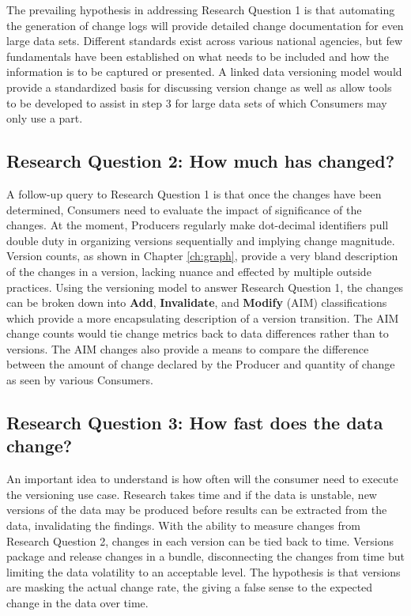 The prevailing hypothesis in addressing Research Question 1 is that automating the generation of change logs will provide detailed change documentation for even large data sets.
Different standards exist across various national agencies, but few fundamentals have been established on what needs to be included and how the information is to be captured or presented.
A linked data versioning model would provide a standardized basis for discussing version change as well as allow tools to be developed to assist in step 3 for large data sets of which Consumers may only use a part.

\subsection{Research Question 2: How much has changed?}

A follow-up query to Research Question 1 is that once the changes have been determined, Consumers need to evaluate the impact of significance of the changes.
At the moment, Producers regularly make dot-decimal identifiers pull double duty in organizing versions sequentially and implying change magnitude.
Version counts, as shown in Chapter \ref{ch:graph}, provide a very bland description of the changes in a version, lacking nuance and effected by multiple outside practices.
Using the versioning model to answer Research Question 1, the changes can be broken down into \textbf{Add}, \textbf{Invalidate}, and \textbf{Modify} (AIM) classifications which provide a more encapsulating description of a version transition.
The AIM change counts would tie change metrics back to data differences rather than to versions.
The AIM changes also provide a means to compare the difference between the amount of change declared by the Producer and quantity of change as seen by various Consumers.

\subsection{Research Question 3: How fast does the data change?}

An important idea to understand is how often will the consumer need to execute the versioning use case.
Research takes time and if the data is unstable, new versions of the data may be produced before results can be extracted from the data, invalidating the findings.
With the ability to measure changes from Research Question 2, changes in each version can be tied back to time.
Versions package and release changes in a bundle, disconnecting the changes from time but limiting the data volatility to an acceptable level.
The hypothesis is that versions are masking the actual change rate, the giving a false sense to the expected change in the data over time.

